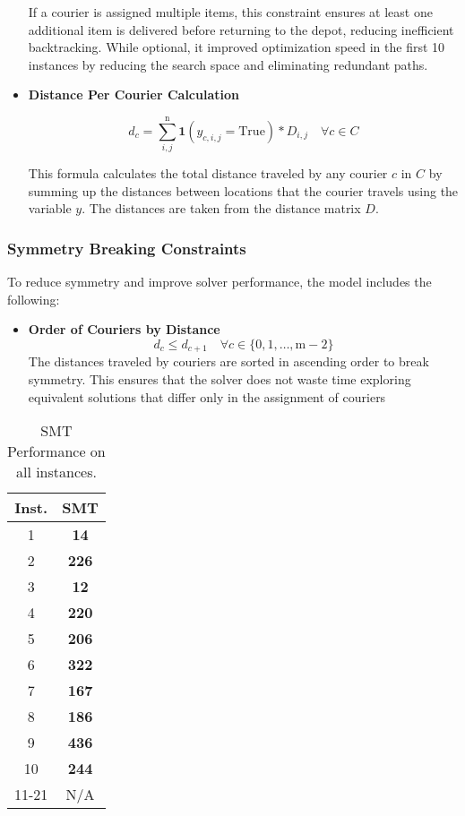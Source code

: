 \begin{itemize}
If a courier is assigned multiple items, this constraint ensures at least one additional item is delivered before returning to the depot, reducing inefficient backtracking. While optional, it improved optimization speed in the first 10 instances by reducing the search space and eliminating redundant paths.

\item \textbf{Distance Per Courier Calculation}

\[ d_c = \sum_{i,j}^{\text{n}} \mathbf{1}(y_{c,i,j} = \text{True})* {D_{i,j}} \quad \forall c \in C
\]

This formula calculates the total distance traveled by any  courier 
$c$ in $C$ by summing up the distances between locations that the courier travels using the variable $y$. The distances are taken from the distance matrix 
$D$.

\end{itemize}
\subsubsection{Symmetry Breaking Constraints}
To reduce symmetry and improve solver performance, the model includes the following:
\begin{itemize}
\item \textbf{Order of Couriers by Distance}
\[ d_c \leq d_{c+1} \quad \forall c \in \{0, 1, \dots, \text{m} - 2\} \]
The distances traveled by couriers are sorted in ascending order to break symmetry. This ensures that the solver does not waste time exploring equivalent solutions that differ only in the assignment of couriers 
\end{itemize}
\begin{table}[ht]
\centering
\begin{tabular}{|c|c|}
\hline
Inst. & SMT \\\hline
1 & \textbf{14} \\
2 & \textbf{226} \\
3 & \textbf{12} \\
4 & \textbf{220} \\
5 & \textbf{206} \\
6 & \textbf{322} \\
7 & \textbf{167} \\
8 & \textbf{186} \\
9 & \textbf{436} \\
10 & \textbf{244} \\
11-21 & N/A \\
\hline
\end{tabular}
\caption{\label{tab:smt_results}SMT Performance on all instances.}
\end{table}

